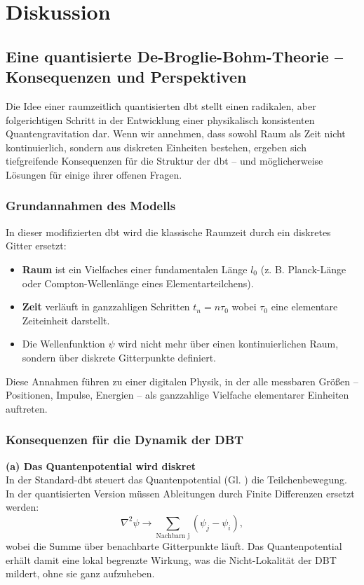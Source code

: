 \chapter{Diskussion}
\label{ch:diskussion}
\section{Eine quantisierte De-Broglie-Bohm-Theorie – Konsequenzen und Perspektiven}
Die Idee einer raumzeitlich quantisierten \gls{dbt} stellt einen radikalen, aber folgerichtigen Schritt in der Entwicklung einer physikalisch konsistenten Quantengravitation dar.
Wenn wir annehmen, dass sowohl Raum als Zeit nicht kontinuierlich, sondern aus diskreten Einheiten bestehen, ergeben sich tiefgreifende Konsequenzen für die Struktur der \gls{dbt} – und
möglicherweise Lösungen für einige ihrer offenen Fragen.

\subsection{Grundannahmen des Modells}
In dieser modifizierten \gls{dbt} wird die klassische Raumzeit durch ein diskretes Gitter ersetzt:
\begin{itemize}
    \item \textbf{Raum} ist ein Vielfaches einer fundamentalen Länge $l_0$ (z. B. Planck-Länge oder Compton-Wellenlänge eines Elementarteilchens).
    \item \textbf{Zeit} verläuft in ganzzahligen Schritten $t_n = n\tau_0$ wobei $\tau_0$ eine elementare Zeiteinheit darstellt.
    \item Die Wellenfunktion $\psi$ wird nicht mehr über einen kontinuierlichen Raum, sondern über diskrete Gitterpunkte definiert.
\end{itemize}
Diese Annahmen führen zu einer digitalen Physik, in der alle messbaren Größen – Positionen, Impulse, Energien – als ganzzahlige Vielfache elementarer Einheiten auftreten.

\subsection{Konsequenzen für die Dynamik der DBT}
\textbf{(a) Das Quantenpotential wird diskret}\\
In der Standard-\gls{dbt} steuert das Quantenpotential (Gl. ) die Teilchenbewegung. In der quantisierten Version müssen Ableitungen durch Finite
Differenzen ersetzt werden:
\begin{equation}
    \nabla^{2} \psi \to \sum_\text{Nachbarn j} \left( \psi_j - \psi_i \right),
\end{equation}
wobei die Summe über benachbarte Gitterpunkte läuft. Das Quantenpotential erhält damit eine lokal begrenzte Wirkung, was die Nicht-Lokalität der DBT mildert, ohne sie ganz aufzuheben.

